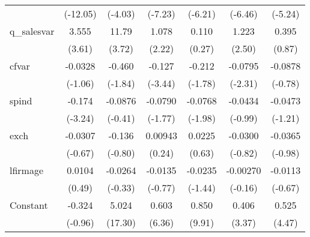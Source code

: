 \begin{table}[htbp]
\begin{tabular}{l*{6}{c}}
                    &    (-12.05)         &     (-4.03)         &     (-7.23)         &     (-6.21)         &     (-6.46)         &     (-5.24)         \\
\addlinespace
q\_salesvar          &       3.555\sym{***}&       11.79\sym{***}&       1.078\sym{*}  &       0.110         &       1.223\sym{*}  &       0.395         \\
                    &      (3.61)         &      (3.72)         &      (2.22)         &      (0.27)         &      (2.50)         &      (0.87)         \\
\addlinespace
cfvar               &     -0.0328         &      -0.460         &      -0.127\sym{***}&      -0.212         &     -0.0795\sym{*}  &     -0.0878         \\
                    &     (-1.06)         &     (-1.84)         &     (-3.44)         &     (-1.78)         &     (-2.31)         &     (-0.78)         \\
\addlinespace
spind               &      -0.174\sym{**} &     -0.0876         &     -0.0790         &     -0.0768\sym{*}  &     -0.0434         &     -0.0473         \\
                    &     (-3.24)         &     (-0.41)         &     (-1.77)         &     (-1.98)         &     (-0.99)         &     (-1.21)         \\
\addlinespace
exch                &     -0.0307         &      -0.136         &     0.00943         &      0.0225         &     -0.0300         &     -0.0365         \\
                    &     (-0.67)         &     (-0.80)         &      (0.24)         &      (0.63)         &     (-0.82)         &     (-0.98)         \\
\addlinespace
lfirmage            &      0.0104         &     -0.0264         &     -0.0135         &     -0.0235         &    -0.00270         &     -0.0113         \\
                    &      (0.49)         &     (-0.33)         &     (-0.77)         &     (-1.44)         &     (-0.16)         &     (-0.67)         \\
\addlinespace
Constant            &      -0.324         &       5.024\sym{***}&       0.603\sym{***}&       0.850\sym{***}&       0.406\sym{***}&       0.525\sym{***}\\
                    &     (-0.96)         &     (17.30)         &      (6.36)         &      (9.91)         &      (3.37)         &      (4.47)         \\

\end{tabular}
\end{table}
